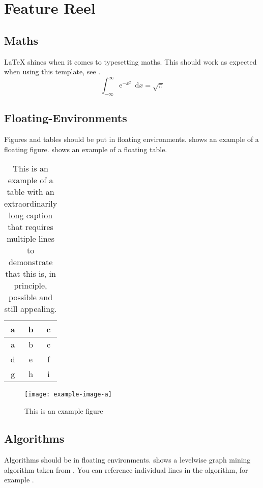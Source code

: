 \chapter{Feature Reel} 

\section{Maths}

\LaTeX{} shines when it comes to typesetting maths. This should work as expected when using this template, see . 
\begin{equation}\label{eq:gauss-integral}
	\int_{-\infty}^{\infty} \mathrm{e}^{-x^2} \enspace \mathrm{d}x = \sqrt{\pi} 
\end{equation}

\section{Floating-Environments} 

Figures and tables should be put in floating environments.
 shows an example of a floating figure.
 shows an example of a floating table.

\begin{table}[ht]
	\centering
	\begin{tabular}{ccc}
		\toprule
		a & b & c \\
		\midrule
		a & b & c \\
		d & e & f \\
		g & h & i \\
		\bottomrule
	\end{tabular}
	\caption{This is an example of a table with an extraordinarily long caption that requires multiple lines to demonstrate that this is, in principle, possible and still appealing.}
	\label{tab:example-table} 
\end{table}

\begin{figure}[ht]
	\centering 
	\texttt{[image: example-image-a]}
	\caption{This is an example figure} 
	\label{fig:example-fig} 
\end{figure}

\section{Algorithms} 
% 
Algorithms should be in floating environments. 
 shows a levelwise graph mining algorithm taken from \cite{theoremofbenda}.
You can reference individual lines in the algorithm, for example .

